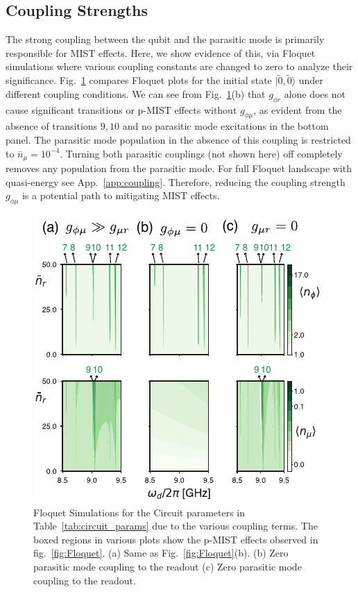 \documentclass[%
reprint,
superscriptaddress,
 amsmath,amssymb,
 aps,
 prx,
longbibliography,
floatfix,
]{revtex4-2}
\begin{document}
\subsection{Coupling Strengths} 
The strong coupling between the qubit and the parasitic mode is primarily responsible for MIST effects. Here, we show evidence of this, via Floquet simulations where various coupling constants are changed to zero to analyze their significance. Fig.~\ref{fig:coupling-Floquet} compares Floquet plots for the initial state $|\tilde{0}, \tilde{0}\rangle$ under different coupling conditions. We can see from Fig.~\ref{fig:coupling-Floquet}(b) that $g_{\phi r}$ alone does not cause significant transitions or p-MIST effects without $g_{\phi \mu}$, as evident from the absence of transitions $9,10$ and no parasitic mode excitations in the bottom panel. The parasitic mode population in the absence of this coupling is restricted to $\bar n_\mu=10^{-4}$. Turning both parasitic couplings (not shown here) off completely removes any population from the parasitic mode. For full Floquet landscape with quasi-energy see App.~\ref{app:coupling}. Therefore, reducing the coupling strength $g_{\phi \mu}$ is a potential path to mitigating MIST effects. 
\begin{figure}[!htb]
    \centering
    \includegraphics[width=\linewidth]{Figures/Floquet_coupling.pdf}
    \caption{Floquet Simulations for the Circuit parameters in Table~\ref{tab:circuit_params} due to the various coupling terms. The boxed regions in various plots show the p-MIST effects observed in fig.~\ref{fig:Floquet}. (a) Same as Fig.~\ref{fig:Floquet}(b). (b) Zero parasitic mode coupling to the readout (c) Zero parasitic mode coupling to the readout.}
    \label{fig:coupling-Floquet}
\end{figure}
\end{document}
